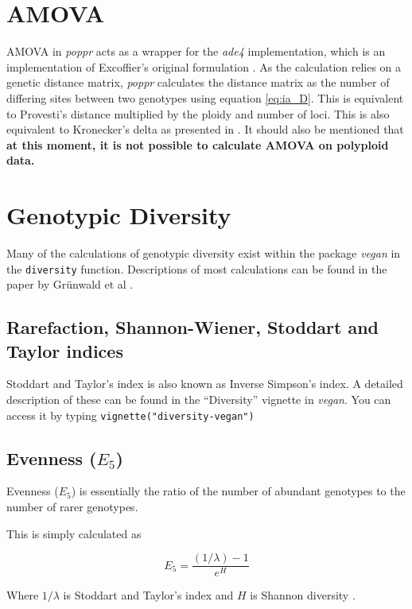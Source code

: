 \documentclass[letterpaper]{article}\usepackage[]{graphicx}\usepackage[]{color}
\newcommand{\poppr}{\textit{poppr}}
\begin{document}
\section{AMOVA}

AMOVA in \poppr{} acts as a wrapper for the \textit{ade4} implementation, which
is an implementation of Excoffier's original formulation
\cite{excoffier1992analysis}. As the calculation relies on a genetic distance
matrix, \poppr{} calculates the distance matrix as the number of differing sites
between two genotypes using equation \ref{eq:ia_D}. This is equivalent to
Provesti's distance multiplied by the ploidy and number of loci. This is also
equivalent to Kronecker's delta as presented in \cite{excoffier1992analysis}. It
should also be mentioned that \textbf{at this moment, it is not possible to calculate
AMOVA on polyploid data.}

\section{Genotypic Diversity}

Many of the calculations of genotypic diversity exist within the package \textit{vegan} in the \texttt{diversity}
function. Descriptions of most calculations can be found in the paper by Gr\"unwald et al \cite{Grunwald:2003}.

\subsection{Rarefaction, Shannon-Wiener, Stoddart and Taylor indices}

Stoddart and Taylor's index is also known as Inverse Simpson's index.
A detailed description of these can be found in the ``Diversity'' vignette in \textit{vegan}. You can access it by typing \texttt{vignette("diversity-vegan")}

\subsection{Evenness ($E_{5}$)}
Evenness ($E_{5}$) is essentially the ratio of the number of abundant genotypes to the number of rarer genotypes.

This is simply calculated as 

\begin{equation}
E_{5} = \frac{(1/\lambda) - 1}{e^{H}}
\end{equation}

Where $1/\lambda$ is Stoddart and Taylor's index and $H$ is Shannon diversity \cite{Stoddart:1988,Shannon:1948}.
\end{document}
